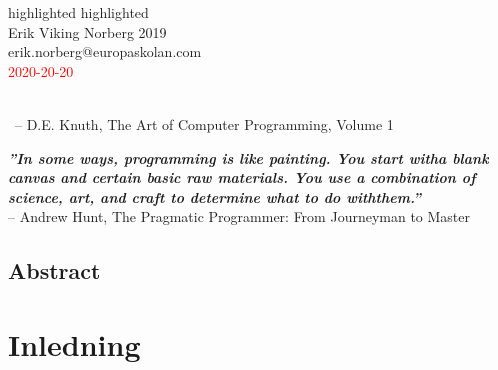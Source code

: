 \documentclass[a4, oneside]{report}
\begin{document}

\newpage

{\color{white} highlighted}
\vfill
{\color{white} highlighted}\\
Erik Viking Norberg 2019\\
erik.norberg@europaskolan.com\\
\textcolor{red}{2020-20-20}

\newpage

\vspace*{\fill}
\textcolor{white}{a}\\
\textcolor{white}{a}\hspace{0.9cm}-- D.E. Knuth, The Art of Computer Programming, Volume 1
\vspace*{\fill}

\newpage

\vspace*{\fill}
{\large \textbf{\textit{''In some ways, programming is like painting. You start witha blank canvas and certain basic raw materials. You use a combination of science, art, and craft to determine what to do withthem.''}}}\\
-- Andrew Hunt, The Pragmatic Programmer: From Journeyman to Master
\vspace*{\fill}

\newpage

\onecolumn
{}
\pagestyle{fancy}
\fancyhf{}
\cfoot{\thepage}


\section*{Abstract}
\blindtext

\newpage
{}
\tableofcontents

\newpage
{}

\chapter{Inledning}
\end{document}
